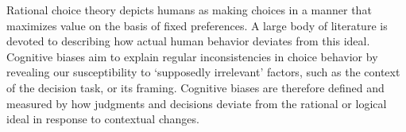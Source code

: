 
Rational choice theory depicts humans as making choices in a manner that maximizes value
on the basis of fixed preferences.
A large body of literature is devoted to describing how actual human behavior deviates from this ideal.
Cognitive biases aim to explain regular inconsistencies in choice behavior
by revealing our susceptibility to `supposedly irrelevant' factors,
such as the context of the decision task, or its framing.
Cognitive biases are therefore defined and measured by how judgments and decisions
deviate from the rational or logical ideal in response to contextual changes.

